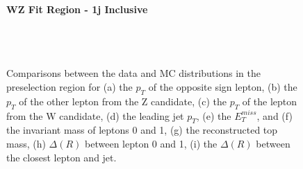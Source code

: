 \begin{figure}[H] 
    \centering
    \textbf{WZ Fit Region - 1j Inclusive}\\                                                                                  
    \\                     
    \\                     
    \\ 
    \caption{Comparisons between the data and MC distributions in the preselection region for (a) the $p_T$ of the opposite sign lepton, (b) the $p_T$ of the other lepton from the Z candidate, (c) the $p_T$ of the lepton from the W candidate, (d) the leading jet $p_T$, (e) the $E_T^{miss}$, and (f) the invariant mass of leptons 0 and 1, (g) the reconstructed top mass, (h) $\Delta(R)$  between lepton 0 and 1, (i) the $\Delta(R)$ between the closest lepton and jet.}                                      
    \label{kin:WP_1j_inc}                                                                                                    
\end{figure}

